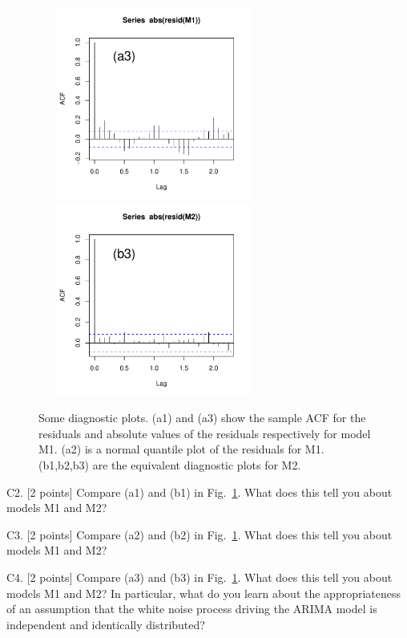 \documentclass[11pt]{article}
\def\qspace{\vspace{1.5in}}
\begin{document}
\begin{figure}[h]
\includegraphics[width=3in,height=2.5in]{m1-resid2}
\hfill\includegraphics[width=3in,height=2.5in]{m2-resid2}

\caption{
Some diagnostic plots. (a1) and (a3) show the sample ACF
for the residuals and absolute values of the residuals
respectively for model M1. (a2) is a normal quantile plot of the residuals for M1.
(b1,b2,b3) are the equivalent diagnostic plots for M2.
}\label{fig:diag}
\end{figure}

\clearpage

C2. [2 points] Compare (a1) and (b1) in Fig.~\ref{fig:diag}. What does this
tell you about models M1 and M2?

\vspace{2.5in}


C3. [2 points] Compare (a2) and (b2) in Fig.~\ref{fig:diag}. What does this
tell you about models M1 and M2?

\vspace{2.5in}

C4. [2 points] Compare (a3) and (b3) in Fig.~\ref{fig:diag}. What does this
tell you about models M1 and M2? In particular, what do you learn about the appropriateness of an assumption that the white noise process driving the ARIMA model is independent and identically distributed?

\vspace{2.5in}
\end{document}

